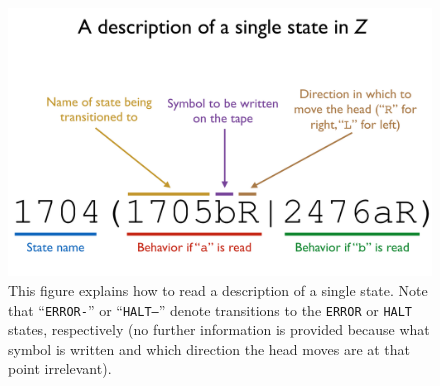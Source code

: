 \documentclass[11pt]{article}
\begin{document}
\begin{appendices}
\begin{figure} 
\begin{center} 
\includegraphics[scale=0.4]{figs/syntax.png}
\caption{This figure explains how to read a description of a single state. Note that ``\texttt{ERROR-}'' or ``\texttt{HALT--}'' denote transitions to the \texttt{ERROR} or \texttt{HALT} states, respectively (no further information is provided because what symbol is written and which direction the head moves are at that point irrelevant). \label{fig:syntax}} 
\end{center} 
\end{figure}


\end{appendices}
\end{document}
